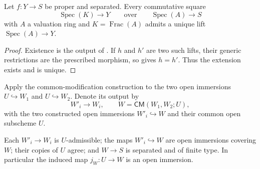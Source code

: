 \begin{lemma}
  \label{lemma:nagata-proper-separated-valuation-extension}

  Let $f\colon Y\to S$ be proper and separated.  Every commutative square
  \[
    \operatorname{Spec}(K)\longrightarrow Y
    \qquad\text{over}\qquad
    \operatorname{Spec}(A)\longrightarrow S
  \]
  with $A$ a valuation ring and $K=\operatorname{Frac}(A)$ admits a unique
  lift $\operatorname{Spec}(A)\to Y$.
\end{lemma}

\begin{proof}
  Existence is the output of
  .  If $h$ and
  $h'$ are two such lifts, their generic restrictions are the prescribed
  morphism, so
   gives $h=h'$.  Thus the
  extension exists and is unique.
\end{proof}

\begin{definition}
  \label{def:nagata-two-open-final-modification}

  Apply the common-modification construction to the two open immersions
  $U\hookrightarrow W_1$ and $U\hookrightarrow W_2$.  Denote its output by
  \[
    W'_i\longrightarrow W_i,
    \qquad
    W=\mathsf{CM}(W_1,W_2;U),
  \]
  with the two constructed open immersions $W'_i\hookrightarrow W$ and their
  common open subscheme $U$.
\end{definition}

\begin{lemma}
  \label{lemma:nagata-two-open-final-modification}

  Each $W'_i\to W_i$ is $U$-admissible; the maps $W'_i\hookrightarrow W$
  are open immersions covering $W$; their copies of $U$ agree; and $W\to S$
  is separated and of finite type.  In particular the induced map
  $j_W\colon U\to W$ is an open immersion.
\end{lemma}

